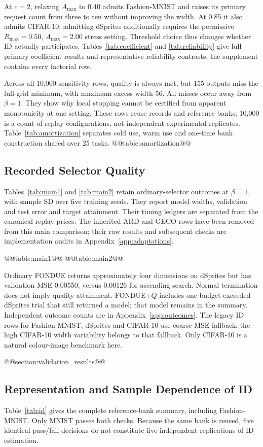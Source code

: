 At $c=2$, relaxing $A_{\max}$ to 0.40 admits Fashion-MNIST and raises its
primary request count from three to ten without improving the width.
At 0.85 it also admits CIFAR-10; admitting dSprites additionally requires
the permissive $R_{\max}=0.50$, $A_{\max}=2.00$ stress setting.
Threshold choice thus changes whether ID actually participates.
Tables~\ref{tab:coefficient} and \ref{tab:reliability} give full primary
coefficient results and representative reliability contrasts; the
supplement contains every factorial row.

Across all 10,000 sensitivity rows, quality is always met, but 155
outputs miss the full-grid minimum, with maximum excess width 56.
All misses occur away from $\beta=1$. They show why local stopping
cannot be certified from apparent monotonicity at one setting.
These rows reuse records and reference banks; 10,000 is a count of
replay configurations, not independent experimental replicates.
Table~\ref{tab:amortization} separates cold use, warm use and one-time
bank construction shared over 25 tasks.
@@table:amortization@@

\subsection{Recorded Selector Quality}
Tables~\ref{tab:main1} and \ref{tab:main2} retain ordinary-selector
outcomes at $\beta=1$, with sample SD over five training seeds.
They report model widths, validation and test error and target attainment.
Their timing ledgers are separated from the canonical replay prices.
The inherited ARD and GECO rows have been removed from this main
comparison; their raw results and subsequent checks are implementation
audits in Appendix~\ref{app:adaptations}.

@@table:main1@@
@@table:main2@@

Ordinary FONDUE returns approximately four dimensions on dSprites
but has validation MSE 0.00550, versus 0.00126 for ascending search.
Normal termination does not imply quality attainment. FONDUE+$Q$
includes one budget-exceeded dSprites trial that still returned a model;
that model remains in the summary. Independent outcome counts are in
Appendix~\ref{app:outcomes}. The legacy ID rows for Fashion-MNIST,
dSprites and CIFAR-10 use coarse-MSE fallback; the high CIFAR-10 width
variability belongs to that fallback. Only CIFAR-10 is a natural
colour-image benchmark here.

@@section:validation_results@@

\subsection{Representation and Sample Dependence of ID}
Table~\ref{tab:id} gives the complete reference-bank summary, including
Fashion-MNIST. Only MNIST passes both checks. Because the same bank is
reused, five identical pass/fail decisions do not constitute five
independent replications of ID estimation.

